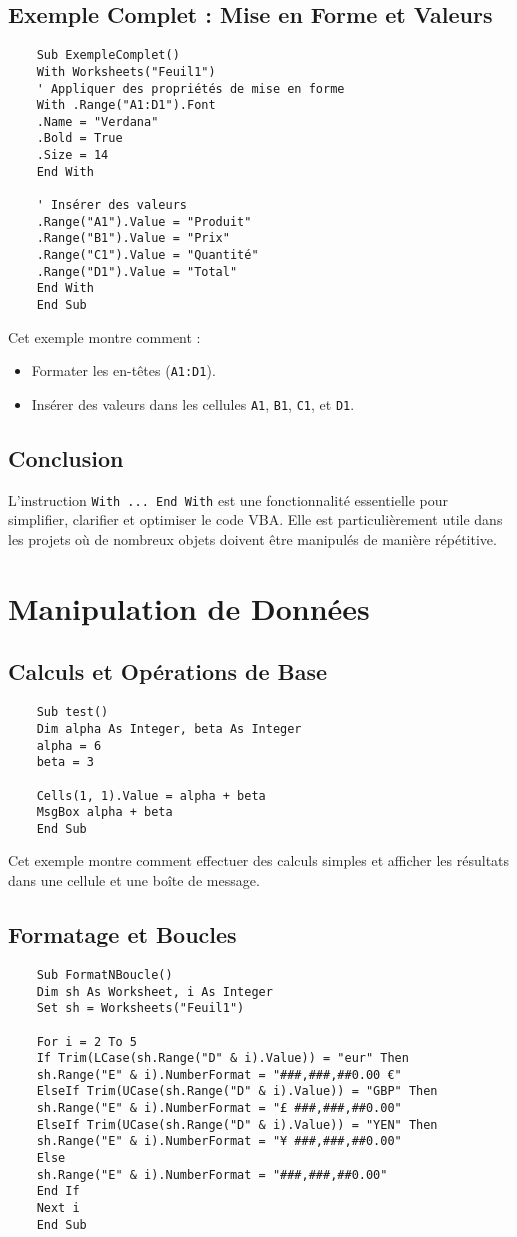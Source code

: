 \documentclass[a4paper,12pt]{report}
\begin{document}
\section{Exemple Complet : Mise en Forme et Valeurs}
\begin{lstlisting}
	Sub ExempleComplet()
	With Worksheets("Feuil1")
	' Appliquer des propriétés de mise en forme
	With .Range("A1:D1").Font
	.Name = "Verdana"
	.Bold = True
	.Size = 14
	End With
	
	' Insérer des valeurs
	.Range("A1").Value = "Produit"
	.Range("B1").Value = "Prix"
	.Range("C1").Value = "Quantité"
	.Range("D1").Value = "Total"
	End With
	End Sub
\end{lstlisting}

Cet exemple montre comment :
\begin{itemize}
	\item Formater les en-têtes (\texttt{A1:D1}).
	\item Insérer des valeurs dans les cellules \texttt{A1}, \texttt{B1}, \texttt{C1}, et \texttt{D1}.
\end{itemize}

\section{Conclusion}
L'instruction \texttt{With ... End With} est une fonctionnalité essentielle pour simplifier, clarifier et optimiser le code VBA. Elle est particulièrement utile dans les projets où de nombreux objets doivent être manipulés de manière répétitive.


\chapter{Manipulation de Données}

\section{Calculs et Opérations de Base}
\begin{lstlisting}
	Sub test()
	Dim alpha As Integer, beta As Integer
	alpha = 6
	beta = 3
	
	Cells(1, 1).Value = alpha + beta
	MsgBox alpha + beta
	End Sub
\end{lstlisting}
Cet exemple montre comment effectuer des calculs simples et afficher les résultats dans une cellule et une boîte de message.
\newpage
\section{Formatage et Boucles}
\begin{lstlisting}
	Sub FormatNBoucle()
	Dim sh As Worksheet, i As Integer
	Set sh = Worksheets("Feuil1")
	
	For i = 2 To 5
	If Trim(LCase(sh.Range("D" & i).Value)) = "eur" Then
	sh.Range("E" & i).NumberFormat = "###,###,##0.00 €"
	ElseIf Trim(UCase(sh.Range("D" & i).Value)) = "GBP" Then
	sh.Range("E" & i).NumberFormat = "£ ###,###,##0.00"
	ElseIf Trim(UCase(sh.Range("D" & i).Value)) = "YEN" Then
	sh.Range("E" & i).NumberFormat = "¥ ###,###,##0.00"
	Else
	sh.Range("E" & i).NumberFormat = "###,###,##0.00"
	End If
	Next i
	End Sub
\end{lstlisting}
\end{document}
